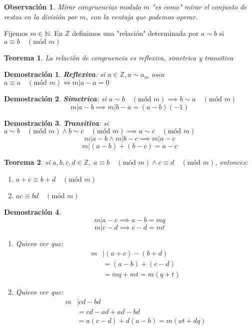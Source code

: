 \documentclass[9pt,a4paper,draft]{article}
\theoremstyle{definition}
\theoremstyle{plain}
\newtheorem{teo}{Teorema}
\newtheorem{demo}{Demostración}[teo]
\newtheorem{obs}{Observación}
\newcommand{\modu}[1]{\quad(\text{mód }#1)}
\begin{document}
\begin{obs}
Mirar congruencias modulo $m$ "es como" mirar el conjunto de restos en la división por $m$, con la ventaja que podemos operar.
\end{obs}

Fijemos $m\in{\mathbb{N}}$. En $\mathbb{Z}$ definimos una "relación" determinada por $a\sim b$ si $a\equiv b \modu{m}$

\begin{teo} La relación de congruencia es reflexiva, simetrica y transitiva\end{teo}

\begin{demo}
{\bfseries Reflexiva}: si $a\in{\mathbb{Z}}, a\sim a_m$ osea $a\equiv a\modu{m} \iff m|a-a = 0$ 
\end{demo}

\begin{demo}
{\bfseries Simetrica}: si $a\sim b\modu{m} \implies b\sim a\modu{m}$
$$ m|a-b \implies m|b-a = (a-b)(-1)$$
\end{demo}

\begin{demo}
{\bfseries Transitiva}: si $a\sim b\modu{m} \land b\sim c\modu{m} \implies a\sim c\modu{m}$
$$m|a-b \land m|b-c \implies m|a-c$$
$$m|(a-b)+(b-c) = a-c$$
\end{demo}

\begin{teo} si $a,b,c,d\in{\mathbb{Z}},\; a\equiv{b}\modu{m} \land c\equiv{d}\modu{m}$, entonces:\\
\begin{enumerate}
\item $a+c\equiv{b+d}\modu{m}$
\item $ac\equiv{bd}\modu{m}$
\end{enumerate}
\end{teo}

\begin{demo}
$$m|a-c \implies a-b = mq$$
$$m|c-d \implies c-d = mt$$

\begin{enumerate}
\item Quiero ver que:
\begin{align*}
m&|(a+c)-(b+d)\\
 &=(a-b)+(c-d)\\
 &=mq+mt = m(q+t)
\end{align*}
\item Quiero ver que:
\begin{align*}
m&|cd-bd\\
 &=cd-ad+ad-bd\\
 &=a(c-d)+d(a-b) = m(at+dq)
\end{align*}
\end{enumerate}
\end{demo}
\end{document}
